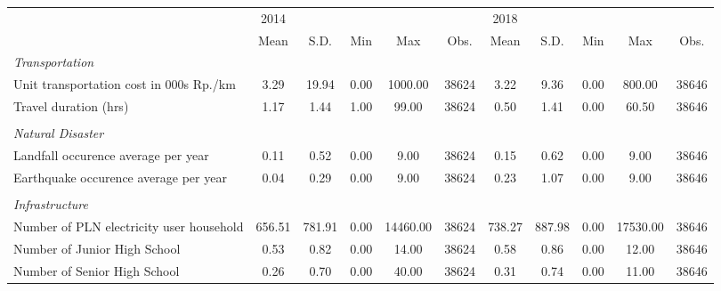 \begin{tabular}{l*{2}{ccccc}}
\toprule
                &     2014&         &         &         &         &     2018&         &         &         &         \\
                &     Mean&     S.D.&      Min&      Max&     Obs.&     Mean&     S.D.&      Min&      Max&     Obs.\\
\midrule
\emph{Transportation}&         &         &         &         &         &         &         &         &         &         \\
\hspace{0.25cm} Unit transportation cost in 000s Rp./km&     3.29&    19.94&     0.00&  1000.00&    38624&     3.22&     9.36&     0.00&   800.00&    38646\\
\hspace{0.25cm} Travel duration (hrs)&     1.17&     1.44&     1.00&    99.00&    38624&     0.50&     1.41&     0.00&    60.50&    38646\\
\\ \emph{Natural Disaster}&         &         &         &         &         &         &         &         &         &         \\
\hspace{0.25cm} Landfall occurence average per year&     0.11&     0.52&     0.00&     9.00&    38624&     0.15&     0.62&     0.00&     9.00&    38646\\
\hspace{0.25cm} Earthquake occurence average per year&     0.04&     0.29&     0.00&     9.00&    38624&     0.23&     1.07&     0.00&     9.00&    38646\\
\\ \emph{Infrastructure}&         &         &         &         &         &         &         &         &         &         \\
\hspace{0.25cm} Number of PLN electricity user household&   656.51&   781.91&     0.00& 14460.00&    38624&   738.27&   887.98&     0.00& 17530.00&    38646\\
\hspace{0.25cm} Number of Junior High School&     0.53&     0.82&     0.00&    14.00&    38624&     0.58&     0.86&     0.00&    12.00&    38646\\
\hspace{0.25cm} Number of Senior High School&     0.26&     0.70&     0.00&    40.00&    38624&     0.31&     0.74&     0.00&    11.00&    38646\\

\end{tabular}
